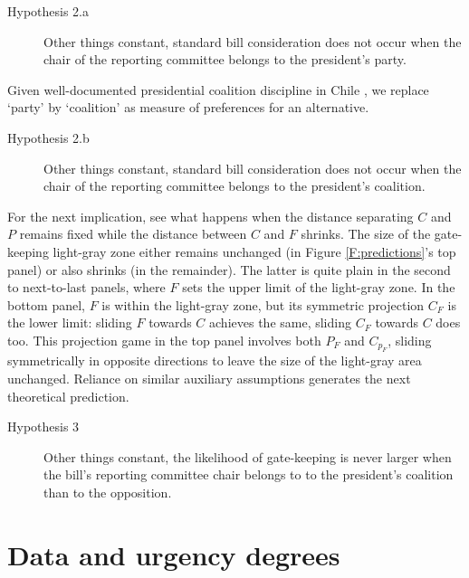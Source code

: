 \documentclass[letter,12pt]{article}
\begin{document}
\begin{description}
  \item [Hypothesis 2.a] Other things constant, standard bill consideration does not occur when the chair of the reporting committee belongs to the president's party. 
\end{description}

\noindent Given well-documented presidential coalition discipline in Chile \citep{aleman.saiegh.coalUnityChile.2007,carey.2002}, we replace `party' by `coalition' as measure of preferences for an alternative. 

\begin{description}
  \item [Hypothesis 2.b] Other things constant, standard bill consideration does not occur when the chair of the reporting committee belongs to the president's coalition. 
\end{description}

For the next implication, see what happens when the distance separating $C$ and $P$ remains fixed while the distance between $C$ and $F$ shrinks. The size of the gate-keeping light-gray zone either remains unchanged (in Figure \ref{F:predictions}'s top panel) or also shrinks (in the remainder). The latter is quite plain in the second to next-to-last panels, where $F$ sets the upper limit of the light-gray zone. In the bottom panel, $F$ is within the light-gray zone, but its symmetric projection $C_F$ is the lower limit: sliding $F$ towards $C$ achieves the same, sliding $C_F$ towards $C$ does too. This projection game in the top panel involves both $P_F$ and $C_{p_F}$, sliding symmetrically in opposite directions to leave the size of the light-gray area unchanged. Reliance on similar auxiliary assumptions generates the next theoretical prediction.

\begin{description}
  \item [Hypothesis 3] Other things constant, the likelihood of gate-keeping is never larger when the bill's reporting committee chair belongs to to the president's coalition than to the opposition. 
\end{description}

\section{Data and urgency degrees}
\end{document}
